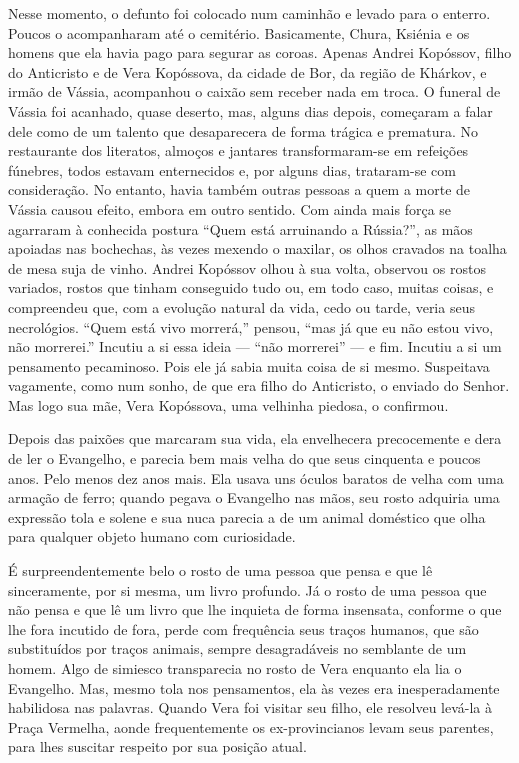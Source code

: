 Nesse momento, o defunto foi colocado num caminhão e levado para o
enterro. Poucos o acompanharam até o cemitério. Basicamente, Chura,
Ksiénia e os homens que ela havia pago para segurar as coroas. Apenas
Andrei Kopóssov, filho do Anticristo e de Vera Kopóssova, da cidade de
Bor, da região de Khárkov, e irmão de Vássia, acompanhou o caixão sem
receber nada em troca. O funeral de Vássia foi acanhado, quase deserto,
mas, alguns dias depois, começaram a falar dele como de um talento que
desaparecera de forma trágica e prematura. No restaurante dos literatos,
almoços e jantares transformaram-se em refeições fúnebres, todos estavam
enternecidos e, por alguns dias, trataram-se com consideração. No
entanto, havia também outras pessoas a quem a morte de Vássia causou
efeito, embora em outro sentido. Com ainda mais força se agarraram à
conhecida postura ``Quem está arruinando a Rússia?'', as mãos apoiadas
nas bochechas, às vezes mexendo o maxilar, os olhos cravados na toalha
de mesa suja de vinho. Andrei Kopóssov olhou à sua volta, observou os
rostos variados, rostos que tinham conseguido tudo ou, em todo caso,
muitas coisas, e compreendeu que, com a evolução natural da vida, cedo
ou tarde, veria seus necrológios. ``Quem está vivo morrerá,'' pensou,
``mas já que eu não estou vivo, não morrerei.'' Incutiu a si essa ideia
--- ``não morrerei'' --- e fim. Incutiu a si um pensamento pecaminoso.
Pois ele já sabia muita coisa de si mesmo. Suspeitava vagamente, como
num sonho, de que era filho do Anticristo, o enviado do Senhor. Mas logo
sua mãe, Vera Kopóssova, uma velhinha piedosa, o confirmou.

Depois das paixões que marcaram sua vida, ela envelhecera precocemente e
dera de ler o Evangelho, e parecia bem mais velha do que seus cinquenta
e poucos anos. Pelo menos dez anos mais. Ela usava uns óculos baratos de
velha com uma armação de ferro; quando pegava o Evangelho nas mãos, seu
rosto adquiria uma expressão tola e solene e sua nuca parecia a de um
animal doméstico que olha para qualquer objeto humano com curiosidade.

É surpreendentemente belo o rosto de uma pessoa que pensa e que lê
sinceramente, por si mesma, um livro profundo. Já o rosto de uma pessoa
que não pensa e que lê um livro que lhe inquieta de forma insensata,
conforme o que lhe fora incutido de fora, perde com frequência seus
traços humanos, que são substituídos por traços animais, sempre
desagradáveis no semblante de um homem. Algo de simiesco transparecia no
rosto de Vera enquanto ela lia o Evangelho. Mas, mesmo tola nos
pensamentos, ela às vezes era inesperadamente habilidosa nas palavras.
Quando Vera foi visitar seu filho, ele resolveu levá-la à Praça
Vermelha, aonde frequentemente os ex-provincianos levam seus parentes,
para lhes suscitar respeito por sua posição atual.

